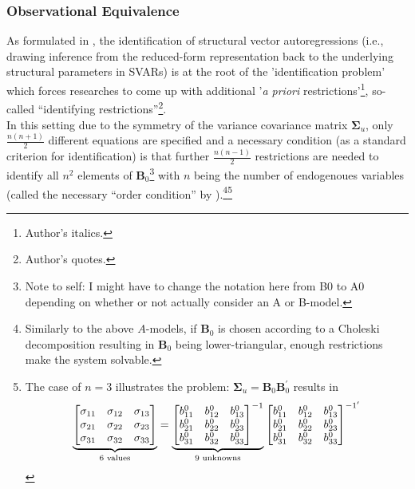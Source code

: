 \documentclass[a4paper,11pt,listof=nochaptergap,oneside,pointednumbers,bibtotoc,bigheadings,liststotoc]{scrbook}
\theoremstyle{mysatz}
\theoremstyle{mydefinition}
\theoremstyle{mybemerkung}
\renewcommand*{\paragraph}[1]{\subsubsection*{#1} \vspace{-3mm}} %
\newcommand{\vect}[1]{\boldsymbol{\mathbf{#1}}}
\begin{document}
\begin{itemize}
\paragraph{Observational Equivalence}
As formulated in \citet{rubioetal:10}, the identification of structural vector autoregressions (i.e., drawing inference from the reduced-form representation back to the underlying structural parameters in SVARs) is at the root of the 'identification problem' which forces researches to come up with additional '\textit{a priori} restrictions'\footnote{Author's italics.}, so-called ``identifying restrictions''\footnote{Author's quotes.}.\\
In this setting due to the symmetry of the variance covariance matrix $\vect{\Sigma}_u$, only $\frac{n(n+1)}{2}$ different equations are specified and a necessary condition (as a standard criterion for identification) is that further $\frac{n(n-1)}{2}$ restrictions are needed to identify all $n^2$ elements of $\vect{B}_0$\footnote{Note to self: I might have to change the notation here from B0 to A0 depending on whether or not \citet{ludvigsonetal:18} actually consider an A or B-model.} with $n$ being the number of endogenoues variables (called the necessary ``order condition'' by \citealp{rothenberg:71}).\footnote{Similarly to the above $A$-models, if $\vect{B}_0$ is chosen according to a Choleski decomposition resulting in $\vect{B}_0$ being lower-triangular, enough restrictions make the system solvable.}\footnote{The case of $n=3$ illustrates the problem: $\vect{\Sigma}_u = \vect{B}_0 \vect{B}_0^'$ results in $$		
		\underbrace{%
		\begin{bmatrix}
    		\sigma_{11} & \sigma_{12} & \sigma_{13} \\
		\sigma_{21} & \sigma_{22} & \sigma_{23} \\
		\sigma_{31} & \sigma_{32} & \sigma_{33}
 		\end{bmatrix}
}_{\text{6 values}} = \underbrace{%
		\begin{bmatrix}
    		b_{11}^0 & b_{12}^0 & b_{13}^0 \\
		b_{21}^0 & b_{22}^0 & b_{23}^0 \\
		b_{31}^0 & b_{32}^0 & b_{33}^0
 		\end{bmatrix}^{-1}
}_{\text{9 unknowns}}
\begin{bmatrix}
    		b_{11}^0 & b_{12}^0 & b_{13}^0 \\
		b_{21}^0 & b_{22}^0 & b_{23}^0 \\
		b_{31}^0 & b_{32}^0 & b_{33}^0
 		\end{bmatrix}^{{-1}'}$$ 
}
\end{itemize}
\end{document}

